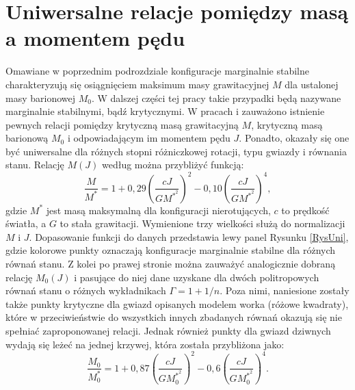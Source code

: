 \documentclass{bachelor_thesis}
\begin{document}
    \section{Uniwersalne relacje pomiędzy masą a momentem pędu}
        Omawiane w poprzednim podrozdziale konfiguracje marginalnie stabilne charakteryzują się osiągnięciem maksimum masy grawitacyjnej $M$ dla ustalonej masy barionowej $M_0$. W dalszej części tej pracy takie przypadki będą nazywane marginalnie stabilnymi, bądź krytycznymi. W pracach \cite{Bozzola2018} i \cite{Weih2018} zauważono istnienie pewnych relacji pomiędzy krytyczną masą grawitacyjną $M$, krytyczną masą barionową $M_0$ i odpowiadającym im momentem pędu $J$. Ponadto, okazały się one być uniwersalne dla różnych stopni różniczkowej rotacji, typu gwiazdy i równania stanu. Relację $M(J)$ według \cite{Bozzola2018} można przybliżyć funkcją:
        \begin{equation}
            \frac{M}{M^*}=1+0,29\left(\frac{cJ}{GM^{*^2}}\right)^2-0,10\left(\frac{cJ}{GM^{*^2}}\right)^4,
            \label{EqUnNeu}
        \end{equation}
        gdzie $M^*$ jest masą maksymalną dla konfiguracji nierotujących, $c$ to prędkość światła, a $G$ to stała grawitacji. Wymienione trzy wielkości służą do normalizacji $M$ i $J$. Dopasowanie funkcji do danych przedstawia lewy panel Rysunku \ref{RysUni}, gdzie kolorowe punkty oznaczają konfiguracje marginalnie stabilne dla różnych równań stanu. Z kolei po prawej stronie można zauważyć analogicznie dobraną relację $M_0(J)$ i pasujące do niej dane uzyskane dla dwóch politropowych równań stanu o różnych wykładnikach $\Gamma=1+1/n$. Poza nimi, naniesione zostały także punkty krytyczne dla gwiazd opisanych modelem worka (różowe kwadraty), które w przeciwieństwie do wszystkich innych zbadanych równań okazują się nie spełniać zaproponowanej relacji. Jednak również punkty dla gwiazd dziwnych wydają się leżeć na jednej krzywej, która została przybliżona jako:
        \begin{equation}
            \frac{M_0}{M_0^*}=1+0,87\left(\frac{cJ}{GM_0^{*^2}}\right)^2-0,6\left(\frac{cJ}{GM_0^{*^2}}\right)^4.
            \label{EqUnSQS}
        \end{equation}
\end{document}
